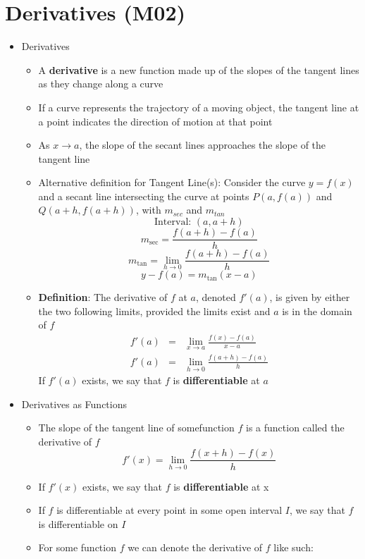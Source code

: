 \documentclass{article}
\begin{document}
\section*{Derivatives (M02)}
\begin{itemize}
    \item Derivatives
    \begin{itemize}
        \item A \textbf{derivative} is a new function made up of the slopes of the tangent lines as they change along a curve
        \item If a curve represents the trajectory of a moving object, the tangent line at a point indicates the direction of motion at that point
        \item As $x \to a$, the slope of the secant lines approaches the slope of the tangent line
        \item Alternative definition for Tangent Line(s): Consider the curve $y = f(x)$ and a secant line intersecting the curve at points $P(a, f(a))$ and $Q(a + h, f(a + h))$, with $m_{sec}$ and $m_{tan}$
        $$\text{Interval: } (a, a + h)$$
        $$m_{\sec} = \frac{f(a + h) - f(a)}{h}$$
        $$m_{\tan} = \lim_{h \to 0}{\frac{f(a + h) - f(a)}{h}}$$
        $$y - f(a) = m_{\tan}(x - a)$$
        \item \textbf{Definition}: The derivative of $f$ at $a$, denoted $f'(a)$, is given by either the two following limits, provided the limits exist and $a$ is in the domain of $f$
        \begin{eqnarray}
            f'(a) &=& \lim_{x \to a}{\frac{f(x) - f(a)}{x - a}} \\
            f'(a) &=& \lim_{h \to 0}{\frac{f(a + h) - f(a)}{h}}
        \end{eqnarray}
        If $f'(a)$ exists, we say that $f$ is \textbf{differentiable} at $a$
    \end{itemize}
\item Derivatives as Functions
    \begin{itemize}
        \item The slope of the tangent line of somefunction $f$ is a function called the derivative of $f$
            $$f'(x) = \lim_{h \to 0}{\frac{f(x + h) - f(x)}{h}}$$
        \item If $f'(x)$ exists, we say that $f$ is \textbf{differentiable} at x
        \item If $f$ is differentiable at every point in some open interval $I$, we say that $f$ is differentiable on $I$
        \item For some function $f$ we can denote the derivative of $f$ like such:

\end{itemize}
\end{itemize}
\end{document}
